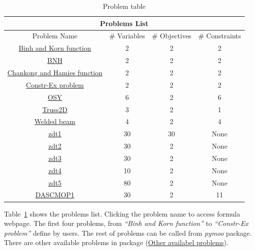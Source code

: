 \documentclass{article}
\begin{document}
\begin{table}[h]
\caption{Problem table}  
\begin{center}
\begin{tabular}{|c||c|c|c|}
    \hline
    \multicolumn{4}{|c|}{\bf{Problems List}} \\
    \hline
    Problem Name     & \# Variables & \# Objectives &\# Constraints\\
    \hline
    \href{https://en.wikipedia.org/wiki/Test_functions_for_optimization}{Binh and Korn function}   & 2    &2&   2\\
    \hline
    \href{https://pymoo.org/problems/multi/bnh.html}{BNH} &2 & 2& 2\\
    \hline
    \href{https://en.wikipedia.org/wiki/Test_functions_for_optimization}{Chankong and Hamies function}&   2  & 2   &2\\
    \hline
    \href{https://en.wikipedia.org/wiki/Test_functions_for_optimization}{Constr-Ex problem} &2 & 2&  2\\
    \hline
    \href{https://pymoo.org/problems/multi/osy.html}{OSY} &6&2&6 \\
    \hline
    \href{https://pymoo.org/problems/multi/truss2d.html}{Truss2D} &3&2&1\\
    \hline
    \href{https://pymoo.org/problems/multi/welded_beam.html}{Welded beam} &4&2&4\\

    \hline
    \href{https://pymoo.org/problems/multi/zdt.html#ZDT1}{zdt1} &30&30&None \\
    \hline
    \href{https://pymoo.org/problems/multi/zdt.html#ZDT2}{zdt2} &30 &2&None \\
    \hline
    \href{https://pymoo.org/problems/multi/zdt.html#ZDT3}{zdt3} &30&2&None \\
    \hline
    \href{https://pymoo.org/problems/multi/zdt.html#ZDT4}{zdt4} &10&2&None \\
    \hline
    \href{https://pymoo.org/problems/multi/zdt.html#ZDT5}{zdt5} &80&2&None \\
    \hline
    \href{https://pymoo.org/problems/constrained/dascmop.html}{DASCMOP1} &30&2&11\\
    \hline
    
\end{tabular}
\end{center}
\label{table:problem}
\end{table}

Table~\ref*{table:problem} shows the problems list. Clicking the problem name to access formula webpage. The first four problems, from \emph{``Binh and Korn function''}
to \emph{``Constr-Ex problem''} define by users. The rest of problems can be called from \emph{pymoo} package. There are other available problems in package (\href{https://pymoo.org/problems/index.html}{Other availabel problems}). 
\end{document}
